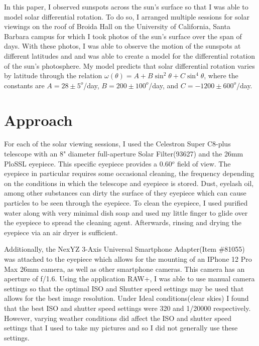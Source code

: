 \documentclass[aps,twocolumn,showpacs,preprintnumbers]{revtex4}
\begin{document}
In this paper, I observed sunspots across the sun's surface so that I was able to model solar differential rotation. To do so, I arranged multiple sessions for solar viewings on the roof of Broida Hall on the University of California, Santa Barbara campus for which I took photos of the sun's surface over the span of days. With these photos, I was able to observe the motion of  the sunspots at different latitudes and and was able to create a model for the differential rotation of the sun's photosphere. My model predicts that solar differential rotation varies by latitude through the relation $\omega(\theta) = A + B\sin^2{\theta} + C\sin^4{\theta}$, where the constants are $A = 28 \pm 5 ^o$/day, $B = 200 \pm 100 ^o$/day, and $C = -1200 \pm 600 ^o$/day. 

\section{Approach}

For each of the solar viewing sessions, I used the Celestron Super C8-plus telescope with an 8" diameter full-aperture Solar Filter(93627) and the 26mm PloSSL eyepiece. This specific eyepiece provides a 0.60$^o$ field of view. The eyepiece in particular requires some occasional cleaning, the frequency depending on the conditions in which the telescope and eyepiece is stored. Dust, eyelash oil, among other substances can dirty the surface of they eyepiece which can cause particles to be seen through the eyepiece. To clean the eyepiece, I used purified water along with very minimal dish soap and used my little finger to glide over the eyepiece to spread the cleaning agent. Afterwards, rinsing and drying the eyepiece via an air dryer is sufficient.

Additionally, the NexYZ 3-Axis Universal Smartphone Adapter(Item \#81055) was attached to the eyepiece which allows for the  mounting of an IPhone 12 Pro Max 26mm camera, as well as other smartphone cameras. This camera has an aperture of f/1.6. Using the application RAW+, I was able to use manual camera settings so that the optimal ISO and Shutter speed settings may be used that allows for the best image resolution. Under Ideal conditions(clear skies) I found that the best ISO and shutter speed settings were 320 and 1/20000 respectively. However, varying weather conditions did affect the ISO and shutter speed settings that I used to take my pictures and so I did not generally use these settings. 
\end{document}

